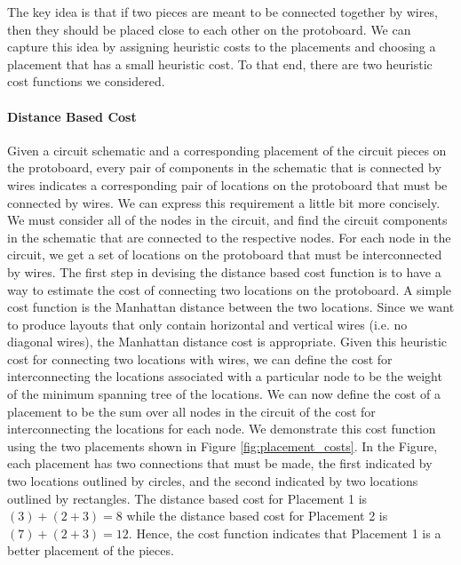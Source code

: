 The key idea is that if two pieces are meant to be connected together by wires,
then they should be placed close to each other on the protoboard. We can
capture this idea by assigning heuristic costs to the placements and choosing
a placement that has a small heuristic cost. To that end, there are two
heuristic cost functions we considered.

\paragraph{Distance Based Cost}
Given a circuit
schematic and a corresponding placement of the circuit pieces on the protoboard,
every pair of components in the schematic that is connected by wires indicates
a corresponding pair of
locations on the protoboard that must be connected by wires. We can
express this requirement a little bit more concisely. We must consider all
of the nodes in the circuit, and find the circuit components in the schematic
that are connected to the respective nodes. For each node in the circuit, we
get a set of locations on the protoboard that must be interconnected by wires.
The first step in devising the distance based cost function is to have a way to
estimate the cost of connecting two locations on the protoboard. A simple
cost function is the Manhattan distance between the two
locations. Since we want to produce layouts that only contain
horizontal and vertical wires (i.e. no diagonal wires), the Manhattan distance
cost is appropriate. Given this heuristic cost for connecting two locations with
wires, we can define the cost for interconnecting the locations
associated with a particular node to be the weight of the minimum spanning tree
of the locations. We can now define the cost of a placement to be the sum over
all nodes in the circuit of the cost for interconnecting the locations for each
node.
We demonstrate this cost function using the two placements shown in Figure
\ref{fig:placement_costs}. In the Figure, each placement has two connections
that must be made, the first indicated by two locations outlined by circles, and
the second
indicated by two locations outlined by rectangles. The distance based cost for
Placement 1 is $(3) + (2 + 3) = 8$ while the distance based cost for Placement 2
is $(7) + (2 + 3) = 12$. Hence, the cost function indicates that Placement 1
is a better placement of the pieces.

